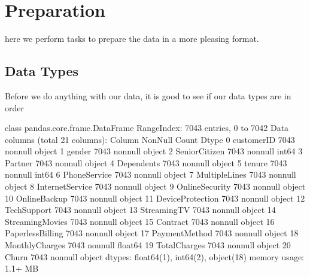 \documentclass[letterpaper,10pt,english]{jupyterBook}
\begin{document}
\section{Preparation}
\label{\detokenize{c7_case_studies/Churn:preparation}}
\sphinxAtStartPar
here we perform tasks to prepare the data in a more pleasing format.


\subsection{Data Types}
\label{\detokenize{c7_case_studies/Churn:data-types}}
\sphinxAtStartPar
Before we do anything with our data, it is good to see if our data types are in order

\begin{sphinxVerbatim}[commandchars=\\\{\}]
\end{sphinxVerbatim}

\begin{sphinxVerbatim}[commandchars=\\\{\}]
\PYGZlt{}class \PYGZsq{}pandas.core.frame.DataFrame\PYGZsq{}\PYGZgt{}
RangeIndex: 7043 entries, 0 to 7042
Data columns (total 21 columns):
 \PYGZsh{}   Column            Non\PYGZhy{}Null Count  Dtype  
\PYGZhy{}\PYGZhy{}\PYGZhy{}  \PYGZhy{}\PYGZhy{}\PYGZhy{}\PYGZhy{}\PYGZhy{}\PYGZhy{}            \PYGZhy{}\PYGZhy{}\PYGZhy{}\PYGZhy{}\PYGZhy{}\PYGZhy{}\PYGZhy{}\PYGZhy{}\PYGZhy{}\PYGZhy{}\PYGZhy{}\PYGZhy{}\PYGZhy{}\PYGZhy{}  \PYGZhy{}\PYGZhy{}\PYGZhy{}\PYGZhy{}\PYGZhy{}  
 0   customerID        7043 non\PYGZhy{}null   object 
 1   gender            7043 non\PYGZhy{}null   object 
 2   SeniorCitizen     7043 non\PYGZhy{}null   int64  
 3   Partner           7043 non\PYGZhy{}null   object 
 4   Dependents        7043 non\PYGZhy{}null   object 
 5   tenure            7043 non\PYGZhy{}null   int64  
 6   PhoneService      7043 non\PYGZhy{}null   object 
 7   MultipleLines     7043 non\PYGZhy{}null   object 
 8   InternetService   7043 non\PYGZhy{}null   object 
 9   OnlineSecurity    7043 non\PYGZhy{}null   object 
 10  OnlineBackup      7043 non\PYGZhy{}null   object 
 11  DeviceProtection  7043 non\PYGZhy{}null   object 
 12  TechSupport       7043 non\PYGZhy{}null   object 
 13  StreamingTV       7043 non\PYGZhy{}null   object 
 14  StreamingMovies   7043 non\PYGZhy{}null   object 
 15  Contract          7043 non\PYGZhy{}null   object 
 16  PaperlessBilling  7043 non\PYGZhy{}null   object 
 17  PaymentMethod     7043 non\PYGZhy{}null   object 
 18  MonthlyCharges    7043 non\PYGZhy{}null   float64
 19  TotalCharges      7043 non\PYGZhy{}null   object 
 20  Churn             7043 non\PYGZhy{}null   object 
dtypes: float64(1), int64(2), object(18)
memory usage: 1.1+ MB
\end{sphinxVerbatim}
\end{document}
